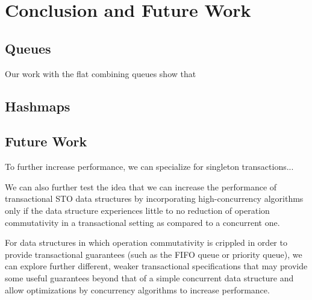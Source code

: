 \chapter{Conclusion and Future Work}

\section{Queues}
Our work with the flat combining queues show that 

\section{Hashmaps}

\section{Future Work}
To further increase performance, we can specialize for singleton transactions...

We can also further test the idea that we can increase the performance of transactional STO data structures by incorporating high-concurrency algorithms only if the data structure experiences little to no reduction of operation commutativity in a transactional setting as compared to a concurrent one.

For data structures in which operation commutativity is crippled in order to provide transactional guarantees (such as the FIFO queue or priority queue), we can explore further different, weaker transactional specifications that may provide some useful guarantees beyond that of a simple concurrent data structure and allow optimizations by concurrency algorithms to increase performance.
